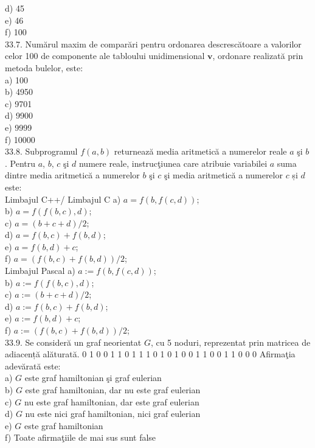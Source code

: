 \begin{itemize}
\begin{enumerate}
d) 45
\\
e) 46
\\
f) 100
\\
33.7. Numărul maxim de comparări pentru ordonarea descrescătoare a valorilor celor 100 de componente ale tabloului unidimensional $\mathbf{v}$, ordonare realizată prin metoda bulelor, este:
\\
a) 100
\\
b) 4950
\\
c) 9701
\\
d) 9900
\\
e) 9999
\\
f) 10000
\\
33.8. Subprogramul $f(a, b)$ returnează media aritmetică a numerelor reale $a$ şi $b$. Pentru $a$, $b$, $c$ şi $d$ numere reale, instrucţiunea care atribuie variabilei $a$ suma dintre media aritmetică a numerelor $b$ şi $c$ şi media aritmetică a numerelor $c$ și $d$ este:
\\
Limbajul C++/ Limbajul C
a) $a=f(b, f(c, d))$;
\\
b) $a=f(f(b, c), d)$;
\\
c) $a=(b+c+d) / 2$;
\\
d) $a=f(b, c)+f(b, d)$;
\\
e) $a=f(b, d)+c$;
\\
f) $a=(f(b, c)+f(b, d)) / 2$;
\\
Limbajul Pascal
a) $a:=f(b, f(c, d))$;
\\
b) $a:=f(f(b, c), d)$;
\\
c) $a:=(b+c+d) / 2$;
\\
d) $a:=f(b, c)+f(b, d)$;
\\
e) $a:=f(b, d)+c$;
\\
f) $a:=(f(b, c)+f(b, d)) / 2$;
\\
33.9. Se consideră un graf neorientat $G$, cu 5 noduri, reprezentat prin matricea de adiacență alăturată.
0 1 0 0 1
1 0 1 1 1
0 1 0 1 0
0 1 1 0 0
1 1 0 0 0
Afirmaţia adevărată este:
\\
a) $G$ este graf hamiltonian şi graf eulerian
\\
b) $G$ este graf hamiltonian, dar nu este graf eulerian
\\
c) $G$ nu este graf hamiltonian, dar este graf eulerian
\\
d) $G$ nu este nici graf hamiltonian, nici graf eulerian
\\
e) $G$ este graf hamiltonian
\\
f) Toate afirmaţiile de mai sus sunt false
\\

\end{enumerate}
\end{itemize}
